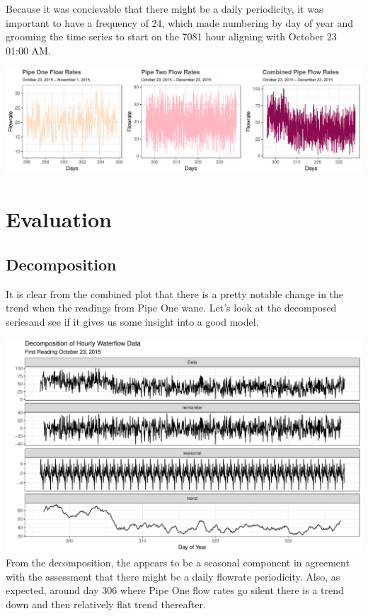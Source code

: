 \documentclass[openany]{book}
\begin{document}
Because it was concievable that there might be a daily periodicity, it
was important to have a frequency of 24, which made numbering by day of
year and grooming the time series to start on the 7081 hour aligning
with October 23 01:00 AM.

\includegraphics{Group2_Project1_Fall2019_files/figure-latex/unnamed-chunk-15-1.pdf}

\hypertarget{evaluation-2}{%
\section{Evaluation}\label{evaluation-2}}

\hypertarget{decomposition}{%
\subsection{Decomposition}\label{decomposition}}

It is clear from the combined plot that there is a pretty notable change
in the trend when the readings from Pipe One wane. Let's look at the
decomposed seriesand see if it gives us some insight into a good model.

\includegraphics{Group2_Project1_Fall2019_files/figure-latex/unnamed-chunk-16-1.pdf}
From the decomposition, the appears to be a seasonal component in
agreement with the assessment that there might be a daily flowrate
periodicity. Also, as expected, around day 306 where Pipe One flow rates
go silent there is a trend down and then relatively flat trend
thereafter.
\end{document}
